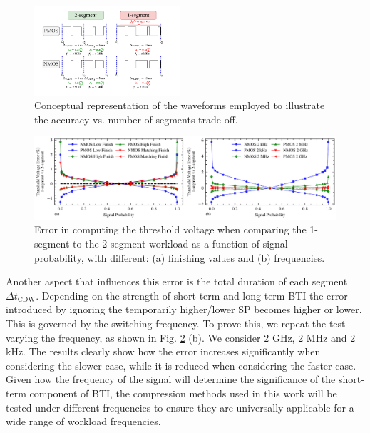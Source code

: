 \begin{figure}[!t]
    \includegraphics[width=0.48\textwidth,trim={7mm 5mm 13mm 3mm},clip]{images/ch2/CDWTestPoints.pdf}
    \caption{Conceptual representation of the waveforms employed to illustrate the accuracy vs. number of segments trade-off.}
    \label{fig:CDWTestPoints}
\end{figure}
\begin{figure}[!t]
    \includegraphics[width=\textwidth,trim={0 0 0 0},clip]{images/ch2/joint_plot_vth_difference_sign_finish.pdf}
    \caption{Error in computing the threshold voltage when comparing the 1-segment to the 2-segment workload as a function of signal probability, with different: (a) finishing values and (b) frequencies.}
    \label{fig:CDWTestFinishSweep}
\end{figure}


Another aspect that influences this error is the total duration of each segment $\Delta t_{\text{CDW}}$. Depending on the strength of short-term and long-term BTI the error introduced by ignoring the temporarily higher/lower SP becomes higher or lower. This is governed by the switching frequency. To prove this, we repeat the test varying the frequency, as shown in Fig. \ref{fig:CDWTestFinishSweep} (b). We consider 2 GHz, 2 MHz and 2 kHz. The results clearly show how the error increases significantly when considering the slower case, while it is reduced when considering the faster case. Given how the frequency of the signal will determine the significance of the short-term component of BTI, the compression methods used in this work will be tested under different frequencies to ensure they are universally applicable for a wide range of workload frequencies. 




